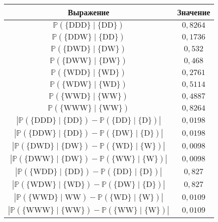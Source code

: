 \begin{multicols}{2}
\begin{table*}
\begin{center}
\tabcolsep=14pt
\begin{tabular}{|c|c|}
\hline
{Выражение}&{Значение}\\
\hline
$\mathbb{P}(\{\mathrm{DDD}\}\mid \{\mathrm{DD}\})$&$0{,}8264$\\
$\mathbb{P}(\{\mathrm{DDW}\}\mid \{\mathrm{DD}\})$&$0{,}1736$\\
$\mathbb{P}(\{\mathrm{DWD}\}\mid \{\mathrm{DW}\})$&$0{,}532$\hphantom{9}\\
$\mathbb{P}(\{\mathrm{DWW}\}\mid \{\mathrm{DW}\})$&$0{,}468$\hphantom{9}\\
$\mathbb{P}(\{\mathrm{WDD}\}\mid \{\mathrm{WD}\})$&$0{,}2761$\\
$\mathbb{P}(\{\mathrm{WDW}\}\mid \{\mathrm{WD}\})$&$0{,}5114$\\
$\mathbb{P}(\{\mathrm{WWD}\}\mid \{\mathrm{WW}\})$&$0{,}4887$\\
$\mathbb{P}(\{\mathrm{WWW}\}\mid \{\mathrm{WW}\})$&$0{,}8264$\\
$\left|\mathbb{P}(\{\mathrm{DDD}\}\mid \{\mathrm{DD}\})-\mathbb{P}
(\{\mathrm{DD}\}\mid \{\mathrm{D}\})\right|$&$0{,}0198$\\
$\left|\mathbb{P}(\{\mathrm{DDW}\}\mid \{\mathrm{DD}\})-\mathbb{P}
(\{\mathrm{DW}\}\mid \{\mathrm{D}\})\right|$&$0{,}0198$\\
$\left|\mathbb{P}(\{\mathrm{DWD}\}\mid \{\mathrm{DW}\})-\mathbb{P}
(\{\mathrm{WD}\}\mid \{\mathrm{W}\})\right|$&$0{,}0098$\\
$\left|\mathbb{P}(\{\mathrm{DWW}\}\mid \{\mathrm{DW}\})-\mathbb{P}
(\{\mathrm{WW}\}\mid \{\mathrm{W}\})\right|$&$0{,}0098$\\
$\left|\mathbb{P}(\{\mathrm{WDD}\}\mid \{\mathrm{DD}\})-\mathbb{P}
(\{\mathrm{DD}\}\mid \{\mathrm{D}\})\right|$&$0{,}827$\hphantom{9}\\
$\left|\mathbb{P}(\{\mathrm{WDW}\}\mid \{\mathrm{WD}\})-\mathbb{P}
(\{\mathrm{DW}\}\mid \{\mathrm{D}\})\right|$&$0{,}827$\hphantom{9}\\
$\left|\mathbb{P}(\{\mathrm{WWD}\}\mid \mathrm{WW})-\mathbb{P}
(\{\mathrm{WD}\}\mid \{\mathrm{W}\})\right|$&$0{,}0109$\\
$\left|\mathbb{P}(\{\mathrm{WWW}\}\mid \{\mathrm{WW}\})-\mathbb{P}
(\{\mathrm{WW}\}\mid \{\mathrm{W}\})\right|$&$0{,}0109$\\
\hline
\end{tabular}
\end{center}
\end{table*}



\end{multicols}
